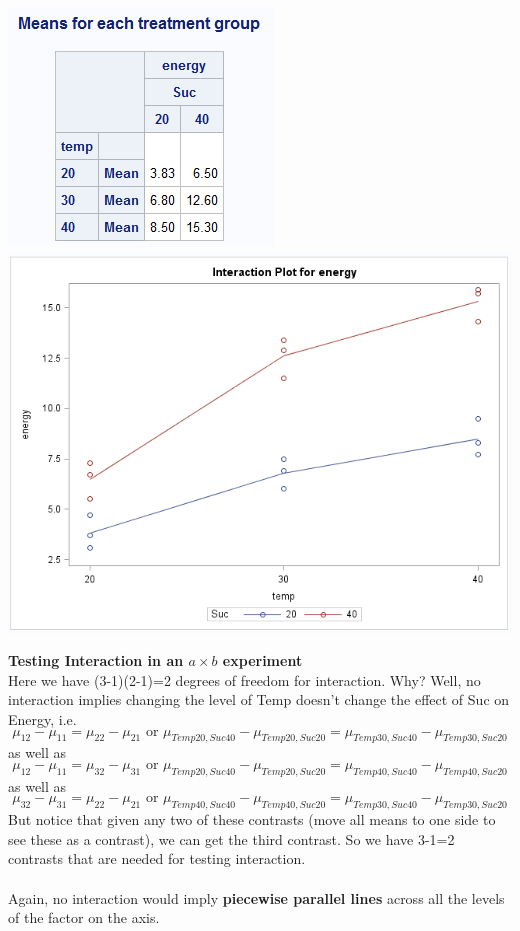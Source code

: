 \begin{center}
\includegraphics[scale=0.9]{EntMeans}\includegraphics[scale=0.6]{Ent2}
\end{center}

\textbf{Testing Interaction in an $a \times b$ experiment}\\
Here we have (3-1)(2-1)=2 degrees of freedom for interaction.  Why?  Well, no interaction implies changing the level of Temp doesn't change the effect of Suc on Energy, i.e.
$$\mu_{12}-\mu_{11}=\mu_{22}-\mu_{21}\mbox{ or }\mu_{Temp20,Suc40}-\mu_{Temp20,Suc20}=\mu_{Temp30,Suc40}-\mu_{Temp30,Suc20}$$
as well as
$$\mu_{12}-\mu_{11}=\mu_{32}-\mu_{31}\mbox{ or }\mu_{Temp20,Suc40}-\mu_{Temp20,Suc20}=\mu_{Temp40,Suc40}-\mu_{Temp40,Suc20}$$
as well as
$$\mu_{32}-\mu_{31}=\mu_{22}-\mu_{21}\mbox{ or }\mu_{Temp40,Suc40}-\mu_{Temp40,Suc20}=\mu_{Temp30,Suc40}-\mu_{Temp30,Suc20}$$
But notice that given any two of these contrasts (move all means to one side to see these as a contrast), we can get the third contrast.  So we have 3-1=2 contrasts that are needed for testing interaction.\\~\\
Again, no interaction would imply \textbf{piecewise parallel lines} across all the levels of the factor on the axis.\\~\\

